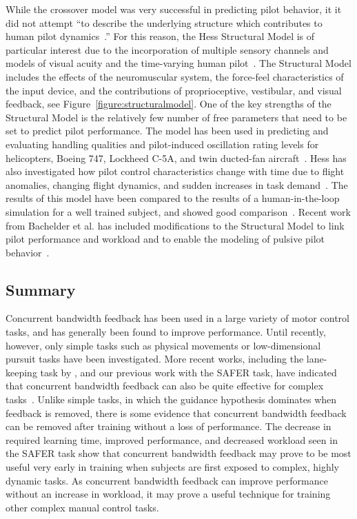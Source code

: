 While the crossover model was very successful in predicting pilot behavior, it it did not attempt ``to describe the underlying structure which contributes to human pilot dynamics~\citep{hess_structural_1980}.''
For this reason, the Hess Structural Model is of particular interest due to the incorporation of multiple sensory channels and models of visual acuity and the time-varying human pilot~\citep{hess_modeling_2009}.
The Structural Model includes the effects of the neuromuscular system, the force-feel characteristics of the input device, and the contributions of proprioceptive, vestibular, and visual feedback, see Figure~\ref{figure:structuralmodel}.
One of the key strengths of the Structural Model is the relatively few number of free parameters that need to be set to predict pilot performance.
The model has been used in predicting and evaluating handling qualities and pilot-induced oscillation rating levels for helicopters, Boeing 747, Lockheed C-5A, and twin ducted-fan aircraft~\citep{hess_analytical_2013, andreea-irina_prediction_2014, grant_handling_2015}.
Hess has also investigated how pilot control characteristics change with time due to flight anomalies, changing flight dynamics, and sudden increases in task demand~\citep{hess_modeling_2009, hess_modeling_2016}.
The results of this model have been compared to the results of a human-in-the-loop simulation for a well trained subject, and showed good comparison~\citep{hess_modeling_2016}.
Recent work from Bachelder et al. has included modifications to the Structural Model to link pilot performance and workload and to enable the modeling of pulsive pilot behavior~\citep{bachelder_modeling_2017, bachelder_linking_2018}.

\subsection{Summary}
Concurrent bandwidth feedback has been used in a large variety of motor control tasks, and has generally been found to improve performance.
Until recently, however, only simple tasks such as physical movements or low-dimensional pursuit tasks have been investigated.
More recent works, including the lane-keeping task by \citeauthor{de_groot_effect_2011}, and our previous work with the SAFER task, have indicated that concurrent bandwidth feedback can also be quite effective for complex tasks~\citep{karasinski_real-time_2017}.
Unlike simple tasks, in which the guidance hypothesis dominates when feedback is removed, there is some evidence that concurrent bandwidth feedback can be removed after training without a loss of performance.
The decrease in required learning time, improved performance, and decreased workload seen in the SAFER task show that concurrent bandwidth feedback may prove to be most useful very early in training when subjects are first exposed to complex, highly dynamic tasks.
As concurrent bandwidth feedback can improve performance without an increase in workload, it may prove a useful technique for training other complex manual control tasks.

